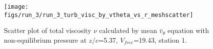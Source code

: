 \begin{figure}[H]
\centering
\texttt{[image: figs/run\_3/run\_3\_turb\_visc\_by\_vtheta\_vs\_r\_meshscatter]}
\caption{Scatter plot of total viscosity $\nu$ calculated by mean $\bar{v}_{\theta}$ equation with non-equilibrium pressure at $z/c$=5.37, $V_{free}$=19.43, station 1.}
\label{fig:run_3_turb_visc_by_vtheta_vs_r_meshscatter}
\end{figure}


